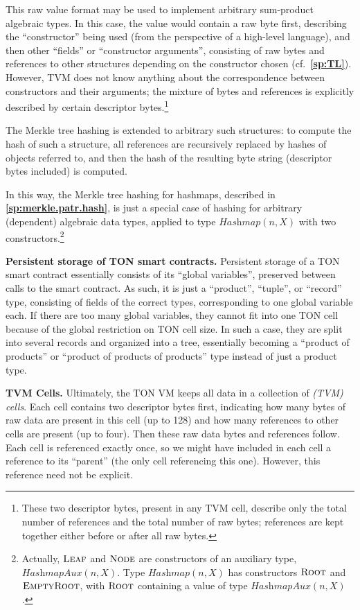 \documentclass[12pt,oneside]{article}
\def\makepoint#1{\medbreak\noindent{\bf #1.\ }}
\def\nxsubpoint{\refstepcounter{subsubsection}%
  \smallbreak\makepoint{\thesubsubsection}}
\def\refpoint#1{{\rm\textbf{\ref{#1}}}}
\let\ptref=\refpoint
\def\embt(#1.){\textbf{#1.}}
\let\tp=\textit
\def\opsc#1{\operatorname{\textsc{#1}}}
\def\leaf{\opsc{Leaf}}
\def\node{\opsc{Node}}
\def\root{\opsc{Root}}
\def\emptyroot{\opsc{EmptyRoot}}
\def\Hashmap{\tp{Hashmap}}
\begin{document}
This raw value format may be used to implement arbitrary sum-product
algebraic types. In this case, the value would contain a raw byte
first, describing the ``constructor'' being used (from the perspective
of a high-level language), and then other ``fields'' or ``constructor
arguments'', consisting of raw bytes and references to other
structures depending on the constructor chosen
(cf.~\ptref{sp:TL}). However, TVM does not know anything about the
correspondence between constructors and their arguments; the mixture
of bytes and references is explicitly described by certain descriptor
bytes.\footnote{These two descriptor bytes, present in any TVM cell,
  describe only the total number of references and the total number of
  raw bytes; references are kept together either before or after all
  raw bytes.}

The Merkle tree hashing is extended to arbitrary such structures: to
compute the hash of such a structure, all references are recursively
replaced by hashes of objects referred to, and then the hash of the
resulting byte string (descriptor bytes included) is computed.

In this way, the Merkle tree hashing for hashmaps, described in
\ptref{sp:merkle.patr.hash}, is just a special case of hashing for
arbitrary (dependent) algebraic data types, applied to type
$\Hashmap(n,X)$ with two constructors.\footnote{Actually, $\leaf$ and
  $\node$ are constructors of an auxiliary type,
  $\tp{HashmapAux}(n,X)$. Type $\Hashmap(n,X)$ has constructors
  $\root$ and $\emptyroot$, with $\root$ containing a value of type
  $\tp{HashmapAux}(n,X)$.}

\nxsubpoint \embt(Persistent storage of TON smart contracts.)
Persistent storage of a TON smart contract essentially consists of its
``global variables'', preserved between calls to the smart
contract. As such, it is just a ``product'', ``tuple'', or ``record''
type, consisting of fields of the correct types, corresponding to one
global variable each. If there are too many global variables, they
cannot fit into one TON cell because of the global restriction on TON
cell size. In such a case, they are split into several records and
organized into a tree, essentially becoming a ``product of products''
or ``product of products of products'' type instead of just a product
type.

\nxsubpoint\label{sp:tvm.cells} \embt(TVM Cells.)  Ultimately, the TON
VM keeps all data in a collection of {\em (TVM) cells}. Each cell
contains two descriptor bytes first, indicating how many bytes of raw
data are present in this cell (up to 128) and how many references to
other cells are present (up to four). Then these raw data bytes and
references follow. Each cell is referenced exactly once, so we might
have included in each cell a reference to its ``parent'' (the only
cell referencing this one). However, this reference need not be
explicit.
\end{document}
